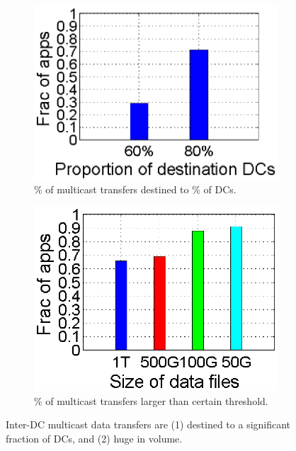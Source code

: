 \begin{figure}[t]
        \centering
        \begin{subfigure}[b]{0.23\textwidth}
                \centering
                \includegraphics[width=\textwidth]{images/destinationDC.eps}%
                \caption{\% of multicast transfers destined to \% of DCs.}
                \label{fig:bulk:dest}
        \end{subfigure}
	\hspace{0.1cm}
        \begin{subfigure}[b]{0.23\textwidth}
                \centering
                \includegraphics[width=\textwidth]{images/DataSize.eps}
                \caption{\% of multicast transfers larger than certain threshold.}
                \label{fig:bulk:size}
        \end{subfigure}
        \caption{Inter-DC multicast data transfers are (1) destined to a significant
fraction of DCs, and (2) huge in volume.}
        \label{fig:bulk}
\vspace{-0.4cm}
\end{figure}

